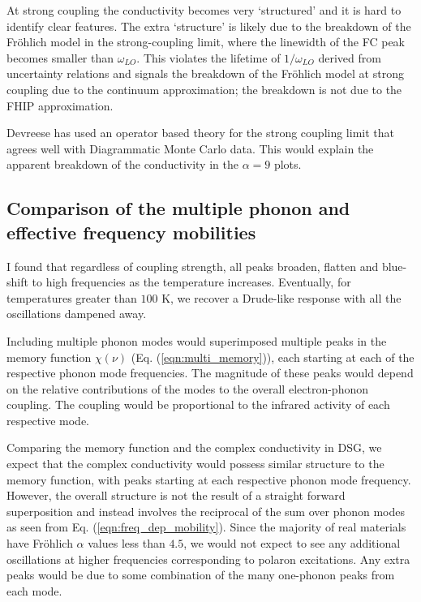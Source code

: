 At strong coupling the conductivity becomes very `structured' and it is hard to identify clear features. The extra `structure' is likely due to the breakdown of the Fr\"ohlich model in the strong-coupling limit, where the linewidth of the FC peak becomes smaller than $\omega_{LO}$. This violates the lifetime of $1 / \omega_{LO}$ derived from uncertainty relations and signals the breakdown of the Fr\"ohlich model at strong coupling due to the continuum approximation; the breakdown is not due to the FHIP approximation. 

Devreese has used an operator based theory \cite{Devreese2001} for the strong coupling limit that agrees well with Diagrammatic Monte Carlo data. This would explain the apparent breakdown of the conductivity in the $\alpha = 9$ plots. 

\subsection{Comparison of the multiple phonon and effective frequency mobilities}

I found that regardless of coupling strength, all peaks broaden, flatten and blue-shift to high frequencies as the temperature increases. Eventually, for temperatures greater than $100$ K, we recover a Drude-like response with all the oscillations dampened away. 

Including multiple phonon modes would superimposed multiple peaks in the memory function $\chi(\nu)$ (Eq. (\ref{eqn:multi_memory})), each starting at each of the respective phonon mode frequencies. The magnitude of these peaks would depend on the relative contributions of the modes to the overall electron-phonon coupling. The coupling would be proportional to the infrared activity of each respective mode. 

Comparing the memory function and the complex conductivity in DSG, we expect that the complex conductivity would possess similar structure to the memory function, with peaks starting at each respective phonon mode frequency. However, the overall structure is not the result of a straight forward superposition and instead involves the reciprocal of the sum over phonon modes as seen from Eq. (\ref{eqn:freq_dep_mobility}). Since the majority of real materials have Fr\"ohlich $\alpha$ values less than $4.5$, we would not expect to see any additional oscillations at higher frequencies corresponding to polaron excitations. Any extra peaks would be due to some combination of the many one-phonon peaks from each mode. 

